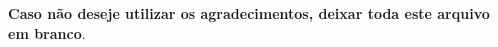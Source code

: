 \begin{agradecimentos}

\textbf{Caso não deseje utilizar os agradecimentos, deixar toda este arquivo
em branco}.
\end{agradecimentos}
